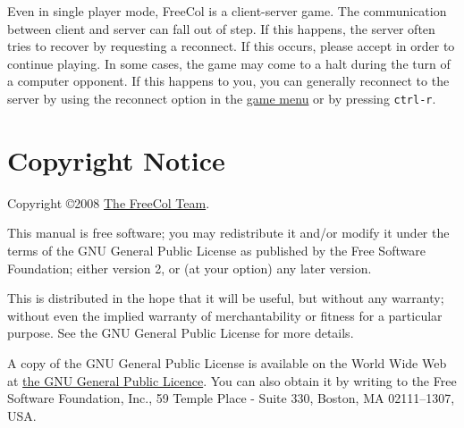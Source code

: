 \documentclass[12pt]{article}
\begin{document}
Even in single player mode, FreeCol is a client-server game. The
communication between client and server can fall out of step. If this
happens, the server often tries to recover by requesting a
reconnect. If this occurs, please accept in order to continue
playing. In some cases, the game may come to a halt during the turn of
a computer opponent. If this happens to you, you can generally
reconnect to the server by using the reconnect option in the
\hyperlink{game menu}{game menu} or by pressing \verb$ctrl-r$.


\hypertarget{Copyright Notice}{\section{Copyright Notice}}

Copyright \copyright 2008
\href{http://freecol.sourceforge.net/index.php?section=8}{The FreeCol
Team}.

This manual is free software; you may redistribute it and/or modify it
under the terms of the GNU General Public License as published by the
Free Software Foundation; either version 2, or (at your option) any
later version.

This is distributed in the hope that it will be useful, but without
any warranty; without even the implied warranty of merchantability or
fitness for a particular purpose. See the GNU General Public License
for more details.

A copy of the GNU General Public License is available on the World
Wide Web at \href{http://www.gnu.org/copyleft/gpl.html}{the GNU
General Public Licence}. You can also obtain it by writing to the Free
Software Foundation, Inc., 59 Temple Place - Suite 330, Boston, MA
02111--1307, USA.


\printindex
\end{document}
